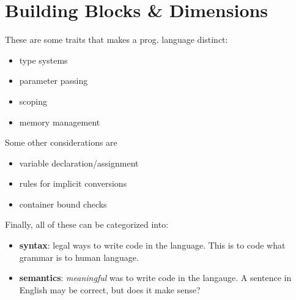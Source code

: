 \section{Building Blocks \& Dimensions}
These are some traits that makes a prog. language distinct:
\begin{itemize}
  \item type systems
  \item parameter passing
  \item scoping
  \item memory management
\end{itemize}
Some other considerations are
\begin{itemize}
  \item variable declaration/assignment
  \item rules for implicit conversions
  \item container bound checks
\end{itemize}
Finally, all of these can be categorized into:
\begin{itemize}
  \item \textbf{syntax}: legal ways to write code in the language. This
  is to code what grammar is to human language.
  \item \textbf{semantics}: \textit{meaningful} was to write code in the
  langauge. A sentence in English may be correct, but does it make
  sense?
\end{itemize}